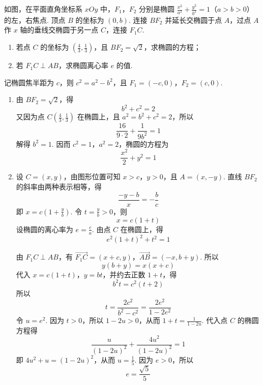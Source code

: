 \begin{problem}
如图，在平面直角坐标系 \(xOy\) 中，\(F_{1}\)，\(F_{2}\) 分别是椭圆 \(\frac{x^2}{a^2} + \frac{y^2}{b^2} = 1\)（\(a > b > 0\)）的左，右焦点. 顶点 \(B\) 的坐标为 \((0, b)\). 连接 \(BF_{2}\) 并延长交椭圆于点 \(A\)，过点 \(A\) 作 \(x\) 轴的垂线交椭圆于另一点 \(C\)，连接 \(F_{1}C\).

\begin{enumerate}
\item 若点 \(C\) 的坐标为 \(\left(\frac{4}{3}, \frac{1}{3}\right)\)，且 \(B F_{2} = \sqrt{2}\)，求椭圆的方程；
\item 若 \(F_{1}C \perp AB\)，求椭圆离心率 \(e\) 的值.
\end{enumerate}

\end{problem}

\begin{solution}
记椭圆焦半距为 \(c\)，则 \(c^2=a^2-b^2\)，且 \(F_1=(-c,0)\)，\(F_2=(c,0)\).

\begin{enumerate}
\item 由 \(BF_2=\sqrt2\)，得
\[
b^2+c^2=2
\]
又因为点 \(C\left(\frac43,\frac13\right)\) 在椭圆上，且 \(a^2=b^2+c^2=2\)，所以
\[
\frac{16}{9\cdot2}+\frac{1}{9b^2}=1
\]
解得 \(b^2=1\). 因而 \(c^2=1\)，\(a^2=2\)，椭圆的方程为
\[
\frac{x^2}{2}+y^2=1
\]

\item 设 \(C=(x,y)\)，由图形位置可知 \(x>c\)，\(y>0\)，且 \(A=(x,-y)\). 直线 \(BF_2\) 的斜率由两种表示相等，得
\[
\frac{-y-b}{x}=-\frac{b}{c}
\]
即 \(x=c\left(1+\frac{y}{b}\right)\). 令 \(t=\frac{y}{b}>0\)，则
\[
x=c(1+t)
\]
设椭圆的离心率为 \(e=\frac ca\). 由点 \(C\) 在椭圆上，得
\[
e^2(1+t)^2+t^2=1
\]

由 \(F_1C\perp AB\)，有 \(\overrightarrow{F_1C}=(x+c,y)\)，\(\overrightarrow{AB}=(-x,b+y)\).
所以
\[
y(b+y)=x(x+c)
\]
代入 \(x=c(1+t)\)，\(y=bt\)，并约去正数 \(1+t\)，得
\[
b^2t=c^2(t+2)
\]
所以
\[
t=\frac{2c^2}{b^2-c^2}=\frac{2e^2}{1-2e^2}
\]
令 \(u=e^2\). 因为 \(t>0\)，所以 \(1-2u>0\)，从而 \(1+t=\frac{1}{1-2u}\). 代入点 \(C\) 的椭圆方程得
\[
\frac{u}{(1-2u)^2}+\frac{4u^2}{(1-2u)^2}=1
\]
即 \(4u^2+u=(1-2u)^2\)，从而 \(u=\frac15\). 因为 \(e>0\)，所以
\[
e=\frac{\sqrt5}{5}
\]
\end{enumerate}
\end{solution}

